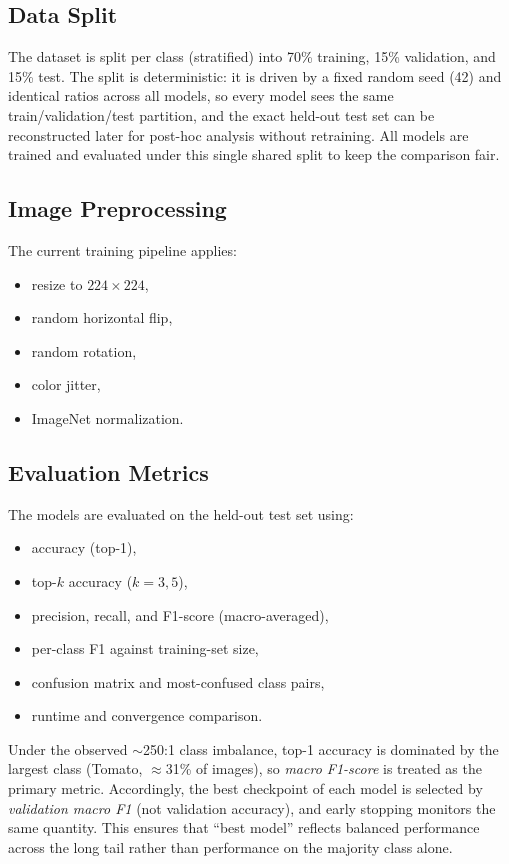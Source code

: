 \documentclass[12pt,a4paper]{article}
\begin{document}
\subsection{Data Split}
The dataset is split per class (stratified) into 70\% training, 15\% validation, and 15\% test. The split is deterministic: it is driven by a fixed random seed (42) and identical ratios across all models, so every model sees the same train/validation/test partition, and the exact held-out test set can be reconstructed later for post-hoc analysis without retraining. All models are trained and evaluated under this single shared split to keep the comparison fair.

\subsection{Image Preprocessing}
The current training pipeline applies:
\begin{itemize}
    \item resize to $224 \times 224$,
    \item random horizontal flip,
    \item random rotation,
    \item color jitter,
    \item ImageNet normalization.
\end{itemize}

\subsection{Evaluation Metrics}
The models are evaluated on the held-out test set using:
\begin{itemize}
    \item accuracy (top-1),
    \item top-$k$ accuracy ($k = 3, 5$),
    \item precision, recall, and F1-score (macro-averaged),
    \item per-class F1 against training-set size,
    \item confusion matrix and most-confused class pairs,
    \item runtime and convergence comparison.
\end{itemize}
Under the observed $\sim$250:1 class imbalance, top-1 accuracy is dominated by the largest class (Tomato, $\approx$31\% of images), so \emph{macro F1-score} is treated as the primary metric. Accordingly, the best checkpoint of each model is selected by \emph{validation macro F1} (not validation accuracy), and early stopping monitors the same quantity. This ensures that ``best model'' reflects balanced performance across the long tail rather than performance on the majority class alone.
\end{document}
